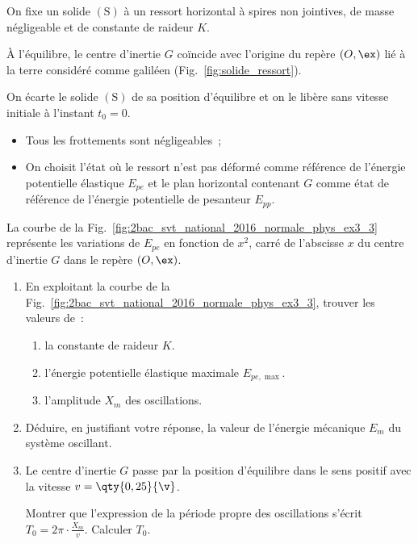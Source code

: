 On fixe un solide $\mathrm{(S)}$ à un ressort horizontal à spires non jointives,
de masse négligeable et de constante de raideur $K$.
    
À l'équilibre, le centre d'inertie $G$ coïncide avec l'origine du repère
$(O,\ex)$ lié à la terre considéré comme galiléen
(Fig.~\ref{fig:solide_ressort}).
    
On écarte le solide $\mathrm{(S)}$ de sa position d'équilibre et on le libère
sans vitesse initiale à l'instant $t_{0}=0$.

\begin{minipage}[t][][b]{0.69\linewidth}
    \begin{donnees}
        \begin{itemize}
          \item Tous les frottements sont négligeables~;
          \item On choisit l'état où le ressort n'est pas déformé comme
                référence de l'énergie potentielle élastique $E_{pe}$ et le plan
                horizontal contenant $G$ comme état de référence de l'énergie
                potentielle de pesanteur $E_{pp}$.
        \end{itemize}
    \end{donnees}

    La courbe de la Fig.~\ref{fig:2bac_svt_national_2016_normale_phys_ex3_3}
    représente les variations de $E_{pe}$ en fonction de $x^{2}$, carré de
    l'abscisse $x$ du centre d'inertie $G$ dans le repère $(O,\ex)$.
    \begin{enumerate}
        \item En exploitant la courbe de la
              Fig.~\ref{fig:2bac_svt_national_2016_normale_phys_ex3_3}, trouver
              les valeurs de~:
              \begin{enumerate}
                  \item la constante de raideur $K$.
                  \item l'énergie potentielle élastique maximale $E_{pe,\max}$.
                  \item l'amplitude $X_{m}$ des oscillations.
              \end{enumerate}
        \item Déduire, en justifiant votre réponse, la valeur de l'énergie
              mécanique $E_{m}$ du système oscillant.
        \item Le centre d'inertie $G$ passe par la position d'équilibre dans le
              sens positif avec la vitesse $v=\qty{0,25}{\v}$.

              Montrer que l'expression de la période propre des oscillations
              s'écrit $T_{0}=2\pi\cdot\frac{X_{m}}{v}$. Calculer $T_{0}$.
    \end{enumerate}
\end{minipage}

